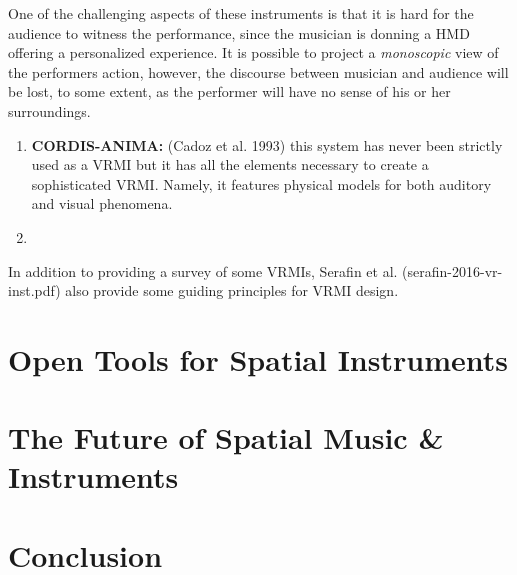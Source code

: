One of the challenging aspects of these instruments is that it is hard for the audience to witness the performance, since the musician is donning a HMD offering a personalized experience. It is possible to project a \textit{monoscopic} view of the performers action, however, the discourse between musician and audience will be lost, to some extent, as the performer will have no sense of his or her surroundings. 

\begin{enumerate}
    \item \textbf{CORDIS-ANIMA:} (Cadoz et al. 1993) this system has never been strictly used as a VRMI but it has all the elements necessary to create a sophisticated VRMI. Namely, it features physical models for both auditory and visual phenomena. 
    
    \item \textbf{}
    
\end{enumerate}

In addition to providing a survey of some VRMIs, Serafin et al. (serafin-2016-vr-inst.pdf) also provide some guiding principles for VRMI design. 

\section{Open Tools for Spatial Instruments}

\section{The Future of Spatial Music \& Instruments}

\section{Conclusion}



